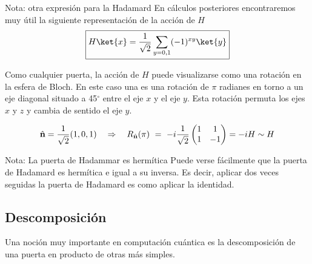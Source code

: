 \documentclass[a4paper,11pt]{book} %
\numberwithin{equation}{chapter}
\def\lp{\left(}
\def\rp{\right)}
\def\rqa{\quad \Rightarrow \quad}
\begin{document}
	\begin{mybox_blue}{Nota: otra expresión para la Hadamard}
	En cálculos posteriores encontraremos muy útil la siguiente representación de la acción de $H$
	\begin{equation} \label{ec_puertas_simples_H_sobre_1_qubit}
	\boxed{H \ket{x} =\frac{1}{\sqrt{2}} \sum_{y=0,1} (-1)^{ x  y} \ket{y}}
	\end{equation}
	\end{mybox_blue}

Como cualquier puerta, la acción de $H$ puede visualizarse como una rotación en la esfera de Bloch. En este caso una es una rotación de $\pi$ radianes en torno a un eje diagonal situado a 45$^\circ$ entre el eje $x$ y el eje $y$. Esta rotación permuta los ejes $x$ y $z$ y cambia de sentido el eje $y$.

\begin{equation}
\hat{\bf n} = \frac{1}{\sqrt{2}}(1,0,1) \rqa 
R_{\hat{\bf n}}(\pi) ~ = ~ -i\frac{1}{\sqrt{2}} \lp \begin{matrix} 1  & 1 \\ 1 & -1  \end{matrix} \rp =-i H \sim H 
\end{equation}

	\begin{mybox_blue}{Nota: La puerta de Hadammar es hermítica}
	Puede verse fácilmente que la puerta de Hadamard es hermítica e igual a su inversa. Es decir, aplicar
	dos veces seguidas la puerta de Hadamard es como aplicar la identidad.
	\end{mybox_blue}


        \subsection{Descomposición}
        
Una noción muy importante en computación cuántica es la descomposición de una puerta en producto de otras más simples. 
\end{document}
